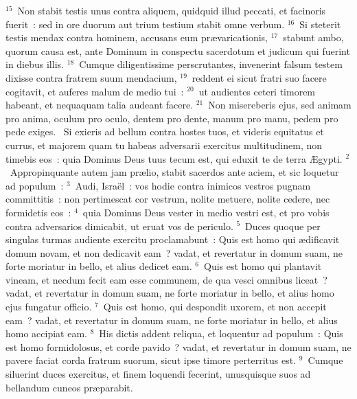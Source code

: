 ${}^{15}$~Non stabit testis unus contra aliquem, quidquid illud peccati, et facinoris fuerit~: sed in ore duorum aut trium testium stabit omne verbum.
${}^{16}$~Si steterit testis mendax contra hominem, accusans eum pr\ae varicationis,
${}^{17}$~stabunt ambo, quorum causa est, ante Dominum in conspectu sacerdotum et judicum qui fuerint in diebus illis.
${}^{18}$~Cumque diligentissime perscrutantes, invenerint falsum testem dixisse contra fratrem suum mendacium,
${}^{19}$~reddent ei sicut fratri suo facere cogitavit, et auferes malum de medio tui~:
${}^{20}$~ut audientes ceteri timorem habeant, et nequaquam talia audeant facere.
${}^{21}$~Non misereberis ejus, sed animam pro anima, oculum pro oculo, dentem pro dente, manum pro manu, pedem pro pede exiges.
~Si exieris ad bellum contra hostes tuos, et videris equitatus et currus, et majorem quam tu habeas adversarii exercitus multitudinem, non timebis eos~: quia Dominus Deus tuus tecum est, qui eduxit te de terra \AE gypti.
${}^{2}$~Appropinquante autem jam pr\ae lio, stabit sacerdos ante aciem, et sic loquetur ad populum~:
${}^{3}$~Audi, Isra\"el~: vos hodie contra inimicos vestros pugnam committitis~: non pertimescat cor vestrum, nolite metuere, nolite cedere, nec formidetis eos~:
${}^{4}$~quia Dominus Deus vester in medio vestri est, et pro vobis contra adversarios dimicabit, ut eruat vos de periculo.
${}^{5}$~Duces quoque per singulas turmas audiente exercitu proclamabunt~: Quis est homo qui \ae dificavit domum novam, et non dedicavit eam~? vadat, et revertatur in domum suam, ne forte moriatur in bello, et alius dedicet eam.
${}^{6}$~Quis est homo qui plantavit vineam, et necdum fecit eam esse communem, de qua vesci omnibus liceat~? vadat, et revertatur in domum suam, ne forte moriatur in bello, et alius homo ejus fungatur officio.
${}^{7}$~Quis est homo, qui despondit uxorem, et non accepit eam~? vadat, et revertatur in domum suam, ne forte moriatur in bello, et alius homo accipiat eam.
${}^{8}$~His dictis addent reliqua, et loquentur ad populum~: Quis est homo formidolosus, et corde pavido~? vadat, et revertatur in domum suam, ne pavere faciat corda fratrum suorum, sicut ipse timore perterritus est.
${}^{9}$~Cumque siluerint duces exercitus, et finem loquendi fecerint, unusquisque suos ad bellandum cuneos pr\ae parabit.


